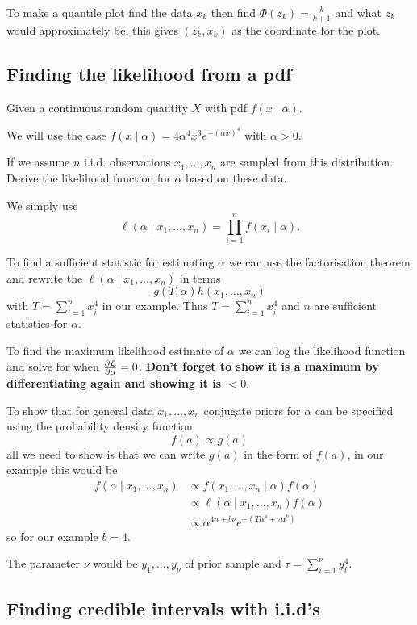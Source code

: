 \documentclass[10pt, a4paper]{article}
\begin{document}
To make a quantile plot find the data $x_k$ then find $\Phi(z_k) = \frac{k}{k + 1}$ and what $z_k$ would approximately be,
this gives $(z_k, x_k)$ as the coordinate for the plot.


\subsection{Finding the likelihood from a pdf}
Given a continuous random quantity $X$ with pdf $f(x\mid \alpha)$.

We will use the case $f(x\mid \alpha) = 4\alpha ^ 4x ^ 3e ^ {-(\alpha x) ^ 4}$ with $\alpha > 0$.

If we assume $n$ i.i.d. observations $x_1, \dotsc, x_n$ are sampled from this distribution.
Derive the likelihood function for $\alpha$ based on these data.

We simply use
\[
\ell(\alpha\mid x_1, \dotsc, x_n) = \prod_{i = 1}^{n}f(x_i\mid \alpha).
\]

To find a sufficient statistic for estimating $\alpha$ we can use the factorisation theorem and rewrite the $\ell(\alpha\mid x_1, \dotsc, x_n)$ in terms
\[
g(T, \alpha)h(x_1, \dotsc, x_n)
\]
with $T = \sum_{i = 1}^{n}x_i ^ 4$ in our example.
Thus $T = \sum_{i = 1}^{n}x_i ^ 4$ and $n$ are sufficient statistics for $\alpha$.

To find the maximum likelihood estimate of $\alpha$ we can log the likelihood function and solve for when $\pd[\mathcal{L}]{\alpha} = 0$.
\textbf{Don't forget to show it is a maximum by differentiating again and showing it is $< 0$}.

To show that for general data $x_1, \dotsc, x_n$ conjugate priors for $\alpha$ can be specified using the probability density function
\[
f(a) \propto g(a)
\]
all we need to show is that we can write $g(a)$ in the form of $f(a)$,
in our example this would be
\begin{align*}
    f(\alpha\mid x_1, \dotsc, x_n) &\propto f(x_1, \dotsc, x_n\mid \alpha)f(\alpha) \\
    &\propto \ell(\alpha\mid x_1, \dotsc, x_n)f(\alpha) \\
    &\propto \alpha ^ {4n + b\nu}e ^ {-(T\alpha ^ 4 + \tau\alpha ^ b)}
\end{align*}
so for our example $b = 4$.

The parameter $\nu$ would be $y_1, \dotsc, y_{\nu}$ of prior sample and $\tau = \sum_{i = 1}^{\nu}y_i ^ 4$.

\subsection{Finding credible intervals with i.i.d's}
\end{document}
